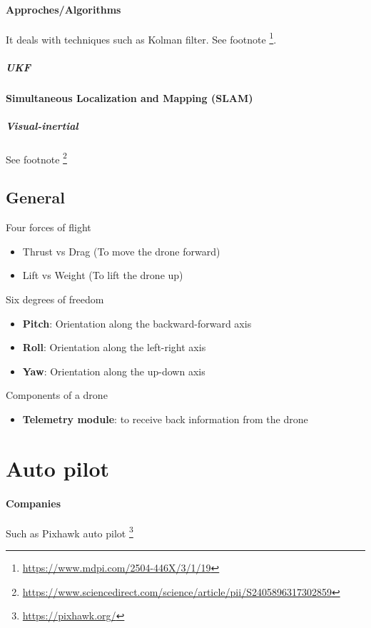 \documentclass{article}
\begin{document}
			\paragraph{Approches/Algorithms}
			It deals with techniques such as Kolman filter. 
			See footnote \footnote{\url{https://www.mdpi.com/2504-446X/3/1/19}}. 
				\subparagraph{UKF}
			\paragraph{Simultaneous Localization and Mapping (SLAM)}
				\subparagraph{Visual-inertial }
				\cite{nikolic-2014-a-synchronized-visual-inertial-sensor-system-with-fpga-pre-processing-for-accurate-real-time-slam}
				\cite{bloesch-2015-robust-visual-inertial-odometry-using-a-direct-ekf-based-approach}
				See footnote \footnote{\url{https://www.sciencedirect.com/science/article/pii/S2405896317302859}}
		\subsection{General}
			\cite{powers-2015-quadrotor-kinematics-and-dynamics}
			Four forces of flight
			\begin{itemize}
				\item Thrust vs Drag (To move the drone forward)
				\item Lift vs Weight (To lift the drone up)
			\end{itemize}
			
			Six degrees of freedom
			\begin{itemize}
				\item \textbf{Pitch}: Orientation along the backward-forward axis 
				\item \textbf{Roll}: Orientation along the left-right axis
				\item \textbf{Yaw}: Orientation along the up-down axis
			\end{itemize}
			
			Components of a drone
			\begin{itemize}
				\item \textbf{Telemetry module}: to receive back information from the drone
			\end{itemize}
		
	
	\section{Auto pilot}
		\paragraph{Companies}
		Such as Pixhawk auto pilot  \footnote{\url{https://pixhawk.org/}}
\end{document}
